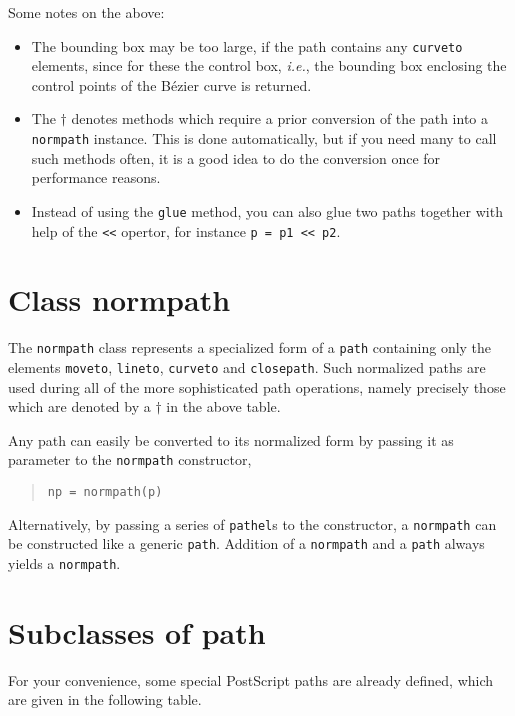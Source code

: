 Some notes on the above:
\begin{itemize}
\item The bounding box may be too large, if the path contains any
  \texttt{curveto} elements, since for these the control box,
  \textit{i.e.}, the bounding box enclosing the control points of
  the B\'ezier curve is returned.
\item The $\dagger$ denotes methods which require a prior
  conversion of the path into a \verb|normpath| instance. This is
  done automatically, but if you need many to call such methods often,
  it is a good idea to do the conversion once for performance reasons.
\item Instead of using the \verb|glue| method, you can also glue two
paths together with help of the \verb|<<| opertor, for instance
\verb|p = p1 << p2|.
\end{itemize}

\section{Class normpath}

The \texttt{normpath} class represents a specialized form of a
\texttt{path} containing only the elements \verb|moveto|,
\verb|lineto|, \verb|curveto| and \verb|closepath|. Such normalized
paths are used during all of the more sophisticated path operations,
namely precisely those which are denoted by a $\dagger$ in the above table.


Any path can
easily be converted to its normalized form by passing it as parameter
to the \texttt{normpath} constructor,
\begin{quote}
\begin{verbatim}
np = normpath(p)
\end{verbatim}
\end{quote}
Alternatively, by passing a series of \texttt{pathel}s to the constructor, a
\texttt{normpath} can be constructed like a generic \texttt{path}.
Addition of a \verb|normpath| and a \verb|path| always yields a
\verb|normpath|.

\section{Subclasses of path}

For your convenience, some special PostScript paths are already defined, which
are given in the following table.

